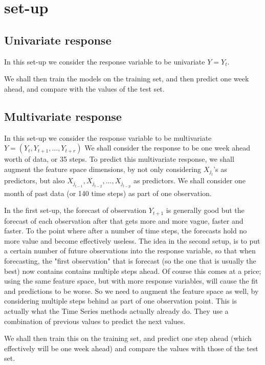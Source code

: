 \section{set-up}

\subsection{Univariate response}
In this set-up we consider the response variable to be univariate $Y=Y_t$.

We shall then train the models on the training set, and then predict one week ahead, and compare with the values of the test set.

\subsection{Multivariate response}
In this set-up we consider the response variable to be multivariate $Y=(Y_t, Y_{t+1}, ..., Y_{t+r})$
We shall consider the response to be one week ahead worth of data, or 35 steps. To predict this multivariate response, we shall augment the feature space dimensions, by not only considering $X_{j_t}$'s as predictors, but also $X_{j_{t-1}},X_{j_{t-2}},...,X_{j_{t-p}}$ as predictors. We shall consider one month of past data (or 140 time steps) as part of one observation.

In the first set-up, the forecast of observation $Y_{t+1}$ is generally good but the forecast of each observation after that gets more and more vague, faster and faster. To the point where after a number of time steps, the forecasts hold no more value and become effectively useless. The idea in the second setup, is to put a certain number of future observations into the response variable, so that when forecasting, the "first observation" that is forecast (so the one that is usually the best) now contains contains multiple steps ahead. Of course this comes at a price; using the same feature space, but with more response variables, will cause the fit and predictions to be worse. So we need to augment the feature space as well, by considering multiple steps behind as part of one observation point. This is actually what the Time Series methods actually already do. They use a combination of previous values to predict the next values.

We shall then train this on the training set, and predict one step ahead (which effectively will be one week ahead) and compare the values with those of the test set.
